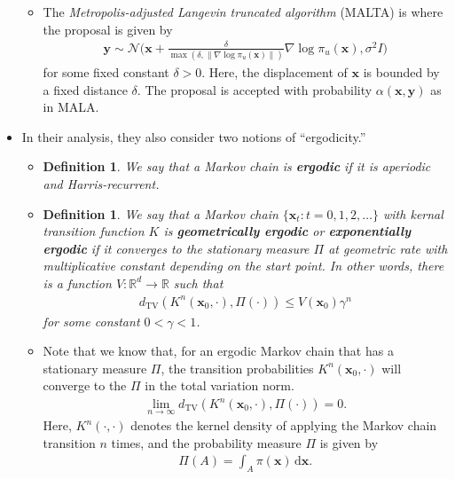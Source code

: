 \documentclass[10pt]{article}
\newtheorem{definition}[lemma]{Definition}
\newcommand{\dee}{\mathrm{d}}
\newcommand{\ve}[1]{\mathbf{#1}}
\newcommand{\mrm}[1]{\mathrm{#1}}
\newcommand{\mcal}[1]{\mathcal{#1}}
\newcommand{\Real}{\mathbb{R}}
\begin{document}
\begin{itemize}
\begin{itemize}
    \item The {\it Metropolis-adjusted Langevin truncated algorithm} (MALTA) is where the proposal is given by
    \begin{align*}
      \ve{y} \sim \mcal{N}\bigg(\ve{x} + \frac{\delta}{\max(\delta, \| \nabla \log \pi_u(\ve{x}) \|)} \nabla \log \pi_u(\ve{x}), \sigma^2 I\bigg)
    \end{align*}
    for some fixed constant $\delta > 0$. Here, the displacement of $\ve{x}$ is bounded by a fixed distance $\delta$. The proposal is accepted with probability $\alpha(\ve{x},\ve{y})$ as in MALA.        
  \end{itemize}

  \item In their analysis, they also consider two notions of ``ergodicity.''
  \begin{itemize}
    \item \begin{definition}
      We say that a Markov chain is {\bf ergodic} if it is aperiodic and Harris-recurrent.
    \end{definition}

    \item \begin{definition}
      We say that a Markov chain $\{ \ve{x}_t: t = 0, 1, 2, \dotsc \}$ with kernal transition function $K$ is {\bf geometrically ergodic} or {\bf exponentially ergodic} if it converges to the stationary measure $\Pi$ at geometric rate with multiplicative constant depending on the start point. In other words, there is a function $V: \Real^d \rightarrow \Real$ such that
      \begin{align*}
        d_{\mrm{TV}}(K^n(\ve{x}_0, \cdot), \Pi(\cdot) ) \leq V(\ve{x}_0) \gamma^n
      \end{align*}
      for some constant $0 < \gamma < 1$.
    \end{definition}

    \item Note that we know that, for an ergodic Markov chain that has a stationary measure $\Pi$, the transition probabilities $K^n(\ve{x}_0, \cdot)$ will converge to the $\Pi$ in the total variation norm.
    \begin{align*}
      \lim_{n \rightarrow \infty} d_{\mrm{TV}}(K^n(\ve{x}_0, \cdot), \Pi(\cdot)) = 0.
    \end{align*}
    Here, $K^n(\cdot, \cdot)$ denotes the kernel density of applying the Markov chain transition $n$ times, and the probability measure $\Pi$ is given by
    \begin{align*}
      \Pi(A) = \int_A \pi(\ve{x})\, \dee\ve{x}.
    \end{align*}
    

\end{itemize}
\end{itemize}
\end{document}
